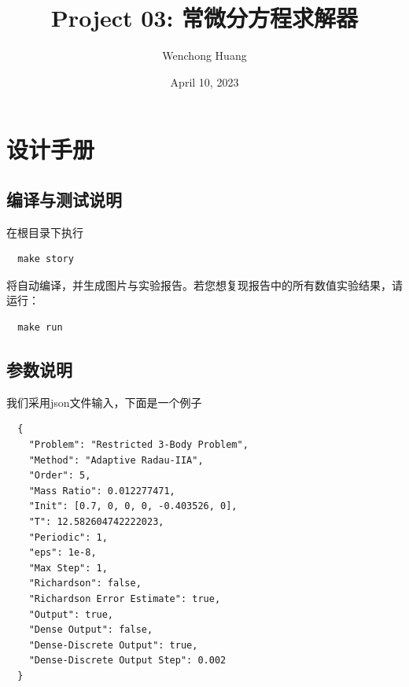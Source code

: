 \documentclass[lang=cn,10pt,bibend=bibtex]{elegantbook}
\title{Project 03: 常微分方程求解器}
\author{Wenchong Huang}
\date{April 10, 2023}
\begin{document}
\maketitle

\frontmatter

\tableofcontents

\mainmatter

\chapter{设计手册}

\section{编译与测试说明}

在根目录下执行
\begin{lstlisting}
  make story
\end{lstlisting}

将自动编译，并生成图片与实验报告。若您想复现报告中的所有数值实验结果，请运行：
\begin{lstlisting}
  make run
\end{lstlisting}

\section{参数说明}

我们采用json文件输入，下面是一个例子

\begin{lstlisting}
  {
    "Problem": "Restricted 3-Body Problem",
    "Method": "Adaptive Radau-IIA",
    "Order": 5,
    "Mass Ratio": 0.012277471,
    "Init": [0.7, 0, 0, 0, -0.403526, 0],
    "T": 12.582604742222023,
    "Periodic": 1,
    "eps": 1e-8,
    "Max Step": 1,
    "Richardson": false,
    "Richardson Error Estimate": true,
    "Output": true,
    "Dense Output": false,
    "Dense-Discrete Output": true,
    "Dense-Discrete Output Step": 0.002
  }
\end{lstlisting}
\end{document}
